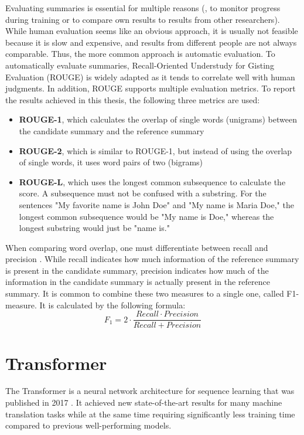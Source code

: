 Evaluating summaries is essential for multiple reasons (\eg, to monitor progress during training or to compare own results to results from other researchers).
While human evaluation seems like an obvious approach, it is usually not feasible because it is slow and expensive, and results from different people are not always comparable.
Thus, the more common approach is automatic evaluation.
To automatically evaluate summaries, Recall-Oriented Understudy for Gisting Evaluation (ROUGE) \cite{lin-2004-rouge} is widely adapted as it tends to correlate well with human judgments.
In addition, ROUGE supports multiple evaluation metrics.
To report the results achieved in this thesis, the following three metrics are used:
\begin{itemize}
\item \textbf{ROUGE-1}, which calculates the overlap of single words (unigrams) between the candidate summary and the reference summary
\item \textbf{ROUGE-2}, which is similar to ROUGE-1, but instead of using the overlap of single words, it uses word pairs of two (bigrams)
\item \textbf{ROUGE-L}, which uses the longest common subsequence to calculate the score. A subsequence must not be confused with a substring. For the sentences "My favorite name is John Doe" and "My name is Maria Doe," the longest common subsequence would be "My name is Doe," whereas the longest substring would just be "name is."
\end{itemize}

When comparing word overlap, one must differentiate between recall and precision \cite{Ting2010}.
While recall indicates how much information of the reference summary is present in the candidate summary, precision indicates how much of the information in the candidate summary is actually present in the reference summary.
It is common to combine these two measures to a single one, called F1-measure.
It is calculated by the following formula:
\[
	F_1 = 2 \cdot \frac{Recall \cdot Precision}{Recall + Precision}
\]


\section{Transformer}\label{sec:transformer}

The Transformer is a neural network architecture for sequence learning that was published in 2017 \cite{1706.03762}.
It achieved new state-of-the-art results for many machine translation tasks while at the same time requiring significantly less training time compared to previous well-performing models.

